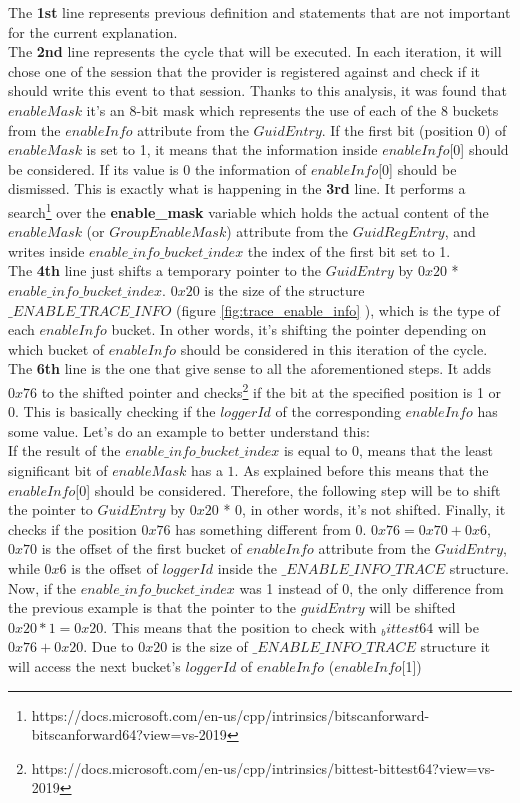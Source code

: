 The {\bfseries 1st} line represents previous definition and statements that are not important for the current explanation. \\
The {\bfseries 2nd} line represents the cycle that will be executed. In each iteration, it will chose one of the session that the provider is registered against and check if it should write this event to that session.
Thanks to this analysis, it was found that $enableMask$ it's an 8-bit mask which represents the use of each of the 8 buckets from the $enableInfo$ attribute from the $GuidEntry$. If the first bit (position 0) of $enableMask$ is set to 1, it means that the information inside $enableInfo$[0] should be considered. If its value is 0 the information of $enableInfo$[0] should be dismissed. %
This is exactly what is happening in the {\bfseries 3rd} line. It performs a search\footnote{https://docs.microsoft.com/en-us/cpp/intrinsics/bitscanforward-bitscanforward64?view=vs-2019} over the {\bfseries enable\_mask} variable which holds the actual content of the $enableMask$ (or $GroupEnableMask$) attribute from the $GuidRegEntry$, and writes inside $enable\_info\_bucket\_index$ the index of the first bit set to 1. \\
The {\bfseries 4th} line just shifts a temporary pointer to the $GuidEntry$ by $0x20$ * $enable\_info\_bucket\_index$. $0x20$ is the size of the structure $\_ENABLE\_TRACE\_INFO$ (figure \ref{fig:trace_enable_info} ), which is the type of each $enableInfo$ bucket. In other words, it's shifting the pointer depending on which bucket of $enableInfo$ should be considered in this iteration of the cycle.\\
The {\bfseries 6th} line is the one that give sense to all the aforementioned steps. It adds $0x76$ to the shifted pointer and checks\footnote{https://docs.microsoft.com/en-us/cpp/intrinsics/bittest-bittest64?view=vs-2019} if the bit at the specified position is 1 or 0. This is basically checking if the $loggerId$  of the corresponding $enableInfo$ has some value. Let's do an example to better understand this: \\
If the result of the $enable\_info\_bucket\_index$ is equal to 0, means that the least significant bit of $enableMask$ has a $1$. As explained before this means that the $enableInfo$[0] should be considered. Therefore, the following step will be to shift the pointer to $GuidEntry$ by $0x20$ * 0, in other words, it's not shifted. Finally, it checks if the position $0x76$ has something different from 0. $0x76 = 0x70 + 0x6$,  $0x70$ is the offset of the first bucket of $enableInfo$ attribute from the $GuidEntry$, while $0x6$ is the offset of $loggerId$ inside the $\_ENABLE\_INFO\_TRACE$ structure. Now, if the $enable\_info\_bucket\_index$ was 1 instead of 0, the only difference from the previous example is that the pointer to the $guidEntry$ will be shifted $0x20 * 1 = 0x20$. This means that the position to check with $_bittest64$ will be $0x76 + 0x20$. Due to $0x20$ is the size of $\_ENABLE\_INFO\_TRACE$ structure it will access the next bucket's $loggerId$ of $enableInfo$ ($enableInfo$[1])\\
